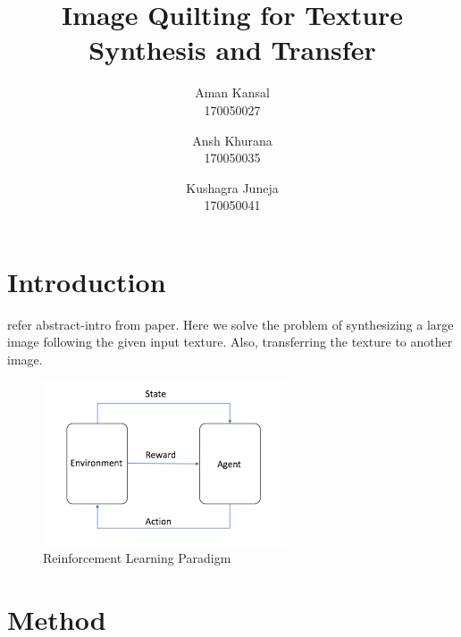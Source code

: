 \documentclass[10pt,twocolumn,letterpaper]{article}
\begin{document}
\title{Image Quilting for Texture Synthesis and Transfer}

\author{Aman Kansal\\
170050027\\
\and
Ansh Khurana\\
170050035\\
\and
Kushagra Juneja\\
170050041
}

\maketitle

   

\section{Introduction}
refer abstract-intro from paper. Here we solve the problem of synthesizing a large image following the given input texture. Also, transferring the texture to another image.  
\begin{figure}[h]
\begin{center}
\includegraphics[scale=0.50]{resources/rl_general.png}
\end{center}
\vspace{-0.2em}
\caption{Reinforcement Learning Paradigm}
\label{fig:basic}
\end{figure}
\vspace{-6pt}
\section{Method}
\end{document}
